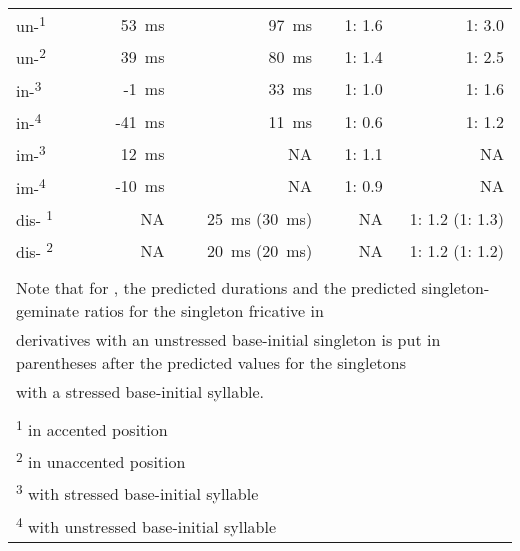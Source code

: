 \begin{table}[H]
\begin{center}
{\begin{tabular} {lrrrr}
				\hline			
				un-\textsuperscript{1}& 53~ms & 97~ms   &  1: 1.6&1: 3.0\\ 
				un-\textsuperscript{2}& 39~ms & 80~ms   & 1: 1.4&1: 2.5\\ 
				
				in-\textsuperscript{3}&-1~ms &33~ms&1: 1.0&1: 1.6\\ 
				in-\textsuperscript{4}&-41~ms &11~ms&  1: 0.6& 1: 1.2\\ 
				
				im-\textsuperscript{3}&12~ms &NA  &  1: 1.1&NA \\ 
				im-\textsuperscript{4}&-10~ms &NA  & 1: 0.9 & NA\\ 
				
				dis- \textsuperscript{1}&NA & 25~ms  (30~ms)&NA &1: 1.2 (1: 1.3)   \\
				dis- \textsuperscript{2}&NA & 20~ms  (20~ms)& NA& 1: 1.2 (1: 1.2) \\
				
				
				\hline
				\\
				\multicolumn{5}{l}{ \footnotesize{Note that for \prefix{dis}, the predicted durations and the predicted singleton-geminate ratios for the singleton fricative in}}\\
				\multicolumn{5}{l}{ \footnotesize{derivatives with an unstressed base-initial singleton is put in parentheses after the predicted values for the singletons}}\\
				\multicolumn{5}{l}{ \footnotesize{with a stressed base-initial syllable.}}\\
				\\				
				\multicolumn{5}{l}{\textsuperscript{1} \footnotesize{in accented position}}\\
				\multicolumn{5}{l}{\textsuperscript{2} \footnotesize{in unaccented position}}\\
				\multicolumn{5}{l}{\textsuperscript{3} \footnotesize{with stressed base-initial syllable}}\\
				\multicolumn{5}{l}{\textsuperscript{4} \footnotesize{with unstressed base-initial syllable}}\\

			\end{tabular}
		}
	\end{center}
	
	
	
\end{table}




